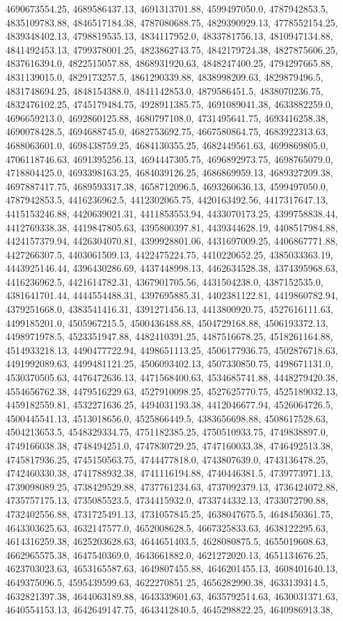 4690673554.25, 4689586437.13, 4691313701.88, 4599497050.0, 4787942853.5, 4835109783.88, 4846517184.38, 4787080688.75, 4829390929.13, 4778552154.25, 4839348402.13, 4798819535.13, 4834117952.0, 4833781756.13, 4810947134.88, 4841492453.13, 4799378001.25, 4823862743.75, 4842179724.38, 4827875606.25, 4837616394.0, 4822515057.88, 4868931920.63, 4848247400.25, 4794297665.88, 4831139015.0, 4829173257.5, 4861290339.88, 4838998209.63, 4829879496.5, 4831748694.25, 4848154388.0, 4841142853.0, 4879586451.5, 4838070236.75, 4832476102.25, 4745179484.75, 4928911385.75, 4691089041.38, 4633882259.0, 4696659213.0, 4692860125.88, 4680797108.0, 4731495641.75, 4693416258.38, 4690078428.5, 4694688745.0, 4682753692.75, 4667580864.75, 4683922313.63, 4688063601.0, 4698438759.25, 4684130355.25, 4682449561.63, 4699869805.0, 4706118746.63, 4691395256.13, 4694447305.75, 4696892973.75, 4698765079.0, 4718804425.0, 4693398163.25, 4684039126.25, 4686869959.13, 4689327209.38, 4697887417.75, 4689593317.38, 4658712096.5, 4693260636.13, 4599497050.0, 4787942853.5, 4416236962.5, 4412302065.75, 4420163492.56, 4417317647.13, 4415153246.88, 4420639021.31, 4411853553.94, 4433070173.25, 4399758838.44, 4412769338.38, 4419847805.63, 4395800397.81, 4439344628.19, 4408517984.88, 4424157379.94, 4426304070.81, 4399928801.06, 4431697009.25, 4406867771.88, 4427266307.5, 4403061509.13, 4422475224.75, 4410220652.25, 4385033363.19, 4443925146.44, 4396430286.69, 4437448998.13, 4462634528.38, 4374395968.63, 4416236962.5, 4421614782.31, 4367901705.56, 4431504238.0, 4387152535.0, 4381641701.44, 4444554488.31, 4397695885.31, 4402381122.81, 4419860782.94, 4379251668.0, 4383541416.31, 4391271456.13, 4413800920.75, 4527616111.63, 4499185201.0, 4505967215.5, 4500436488.88, 4504729168.88, 4506193372.13, 4498971978.5, 4523351947.88, 4482410391.25, 4487516678.25, 4518261164.88, 4514933218.13, 4490477722.94, 4498651113.25, 4506177936.75, 4502876718.63, 4491992089.63, 4499481121.25, 4506093402.13, 4507330850.75, 4498671131.0, 4530370505.63, 4476472636.13, 4471568400.63, 4534685741.88, 4448279420.38, 4554656762.38, 4479516229.63, 4527910098.25, 4527625770.75, 4525189032.13, 4459182559.81, 4532271636.25, 4494031193.38, 4412046677.94, 4526064726.5, 4500445541.13, 4513018656.0, 4525866449.5, 4383656698.88, 4508617528.63, 4504213653.5, 4548329334.75, 4751182385.25, 4750510933.75, 4749838897.0, 4749166038.38, 4748494251.0, 4747830729.25, 4747160033.38, 4746492513.38, 4745817936.25, 4745150563.75, 4744477818.0, 4743807639.0, 4743136478.25, 4742460330.38, 4741788932.38, 4741116194.88, 4740446381.5, 4739773971.13, 4739098089.25, 4738429529.88, 4737761234.63, 4737092379.13, 4736424072.88, 4735757175.13, 4735085523.5, 4734415932.0, 4733744332.13, 4733072790.88, 4732402556.88, 4731725491.13, 4731057845.25, 4638047675.5, 4648450361.75, 4643303625.63, 4632147577.0, 4652008628.5, 4667325833.63, 4638122295.63, 4614316259.38, 4625203628.63, 4644651403.5, 4628080875.5, 4655019608.63, 4662965575.38, 4647540369.0, 4643661882.0, 4621272020.13, 4651134676.25, 4623703023.63, 4653165587.63, 4649807455.88, 4646201455.13, 4608401640.13, 4649375096.5, 4595439599.63, 4622270851.25, 4656282990.38, 4633139314.5, 4632821397.38, 4644063189.88, 4643339601.63, 4635792514.63, 4630031371.63, 4640554153.13, 4642649147.75, 4643412840.5, 4645298822.25, 4640986913.38, 